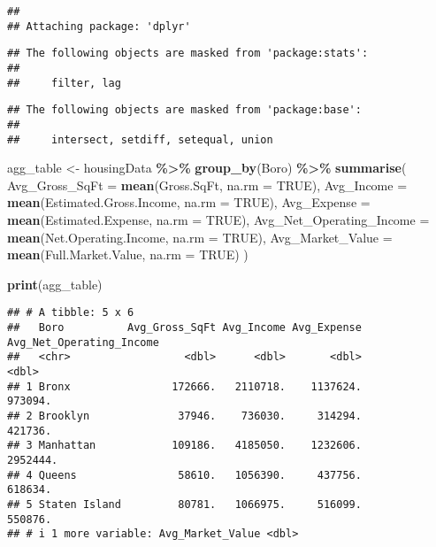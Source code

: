 \documentclass[
]{article}
\newenvironment{Shaded}{\begin{snugshade}}{\end{snugshade}}
\newcommand{\AttributeTok}[1]{\textcolor[rgb]{0.13,0.29,0.53}{#1}}
\newcommand{\ConstantTok}[1]{\textcolor[rgb]{0.56,0.35,0.01}{#1}}
\newcommand{\FunctionTok}[1]{\textcolor[rgb]{0.13,0.29,0.53}{\textbf{#1}}}
\newcommand{\NormalTok}[1]{#1}
\newcommand{\OtherTok}[1]{\textcolor[rgb]{0.56,0.35,0.01}{#1}}
\newcommand{\SpecialCharTok}[1]{\textcolor[rgb]{0.81,0.36,0.00}{\textbf{#1}}}
\begin{document}
\begin{verbatim}
## 
## Attaching package: 'dplyr'
\end{verbatim}

\begin{verbatim}
## The following objects are masked from 'package:stats':
## 
##     filter, lag
\end{verbatim}

\begin{verbatim}
## The following objects are masked from 'package:base':
## 
##     intersect, setdiff, setequal, union
\end{verbatim}

\begin{Shaded}
\begin{Highlighting}[]
\NormalTok{agg\_table }\OtherTok{\textless{}{-}}\NormalTok{ housingData }\SpecialCharTok{\%\textgreater{}\%}
  \FunctionTok{group\_by}\NormalTok{(Boro) }\SpecialCharTok{\%\textgreater{}\%}
  \FunctionTok{summarise}\NormalTok{(}
    \AttributeTok{Avg\_Gross\_SqFt =} \FunctionTok{mean}\NormalTok{(Gross.SqFt, }\AttributeTok{na.rm =} \ConstantTok{TRUE}\NormalTok{),}
    \AttributeTok{Avg\_Income =} \FunctionTok{mean}\NormalTok{(Estimated.Gross.Income, }\AttributeTok{na.rm =} \ConstantTok{TRUE}\NormalTok{),}
    \AttributeTok{Avg\_Expense =} \FunctionTok{mean}\NormalTok{(Estimated.Expense, }\AttributeTok{na.rm =} \ConstantTok{TRUE}\NormalTok{),}
    \AttributeTok{Avg\_Net\_Operating\_Income =} \FunctionTok{mean}\NormalTok{(Net.Operating.Income, }\AttributeTok{na.rm =} \ConstantTok{TRUE}\NormalTok{),}
    \AttributeTok{Avg\_Market\_Value =} \FunctionTok{mean}\NormalTok{(Full.Market.Value, }\AttributeTok{na.rm =} \ConstantTok{TRUE}\NormalTok{)}
\NormalTok{  )}

\FunctionTok{print}\NormalTok{(agg\_table)}
\end{Highlighting}
\end{Shaded}

\begin{verbatim}
## # A tibble: 5 x 6
##   Boro          Avg_Gross_SqFt Avg_Income Avg_Expense Avg_Net_Operating_Income
##   <chr>                  <dbl>      <dbl>       <dbl>                    <dbl>
## 1 Bronx                172666.   2110718.    1137624.                  973094.
## 2 Brooklyn              37946.    736030.     314294.                  421736.
## 3 Manhattan            109186.   4185050.    1232606.                 2952444.
## 4 Queens                58610.   1056390.     437756.                  618634.
## 5 Staten Island         80781.   1066975.     516099.                  550876.
## # i 1 more variable: Avg_Market_Value <dbl>
\end{verbatim}
\end{document}
